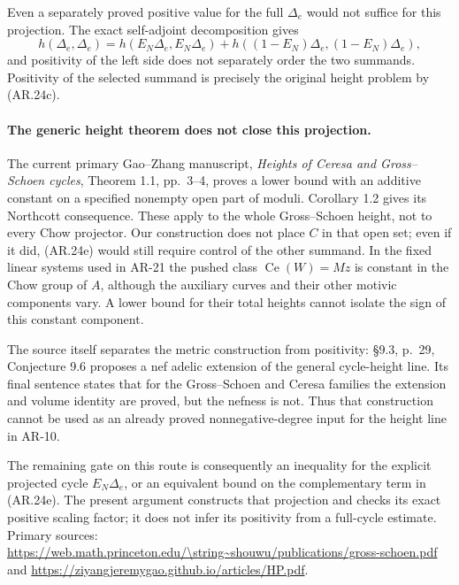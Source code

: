 Even a separately proved positive value for the full $\Delta_e$
would not suffice for this projection.  The exact self-adjoint
decomposition gives
\[
 h(\Delta_e,\Delta_e)
 =h(E_N\Delta_e,E_N\Delta_e)
  +h((1-E_N)\Delta_e,(1-E_N)\Delta_e),                 \tag{AR.24e}
\]
and positivity of the left side does not separately order the two
summands.  Positivity of the selected summand is precisely the
original height problem by (AR.24c).

\paragraph{The generic height theorem does not close this projection.}
The current primary Gao--Zhang manuscript, \emph{Heights of Ceresa
and Gross--Schoen cycles}, Theorem 1.1, pp.~3--4, proves a lower
bound with an additive constant on a specified nonempty open part
of moduli.  Corollary 1.2 gives its Northcott consequence.  These
apply to the whole Gross--Schoen height, not to every Chow
projector.  Our construction does not place $C$ in that open set;
even if it did, (AR.24e) would still require control of the other
summand.  In the fixed linear systems used in AR-21 the pushed
class $\operatorname{Ce}(W)=Mz$ is constant in the Chow group of
$A$, although the auxiliary curves and their other motivic
components vary.  A lower bound for their total heights cannot
isolate the sign of this constant component.

The source itself separates the metric construction from positivity:
\S9.3, p.~29, Conjecture 9.6 proposes a nef adelic extension of the
general cycle-height line.  Its final sentence states that for the
Gross--Schoen and Ceresa families the extension and volume identity
are proved, but the nefness is not.  Thus that construction cannot
be used as an already proved nonnegative-degree input for the
height line in AR-10.

The remaining gate on this route is consequently an inequality
for the explicit projected cycle $E_N\Delta_e$, or an equivalent
bound on the complementary term in (AR.24e).  The present argument
constructs that projection and checks its exact positive scaling
factor; it does not infer its positivity from a full-cycle estimate.
Primary sources:
\url{https://web.math.princeton.edu/\string~shouwu/publications/gross-schoen.pdf}
and \url{https://ziyangjeremygao.github.io/articles/HP.pdf}.
